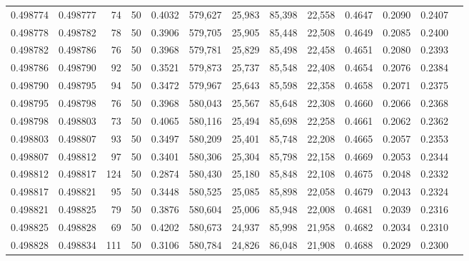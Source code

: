 \begin{tabular}{rrrrrrrrrrrrr}
0.498774 & 0.498777 &    74 &  50 &                                     0.4032 & 579,627 &  25,983 &  85,398 &  22,558 & 0.4647 & 0.2090 & 0.2407 \\
0.498778 & 0.498782 &    78 &  50 &                                     0.3906 & 579,705 &  25,905 &  85,448 &  22,508 & 0.4649 & 0.2085 & 0.2400 \\
0.498782 & 0.498786 &    76 &  50 &                                     0.3968 & 579,781 &  25,829 &  85,498 &  22,458 & 0.4651 & 0.2080 & 0.2393 \\
0.498786 & 0.498790 &    92 &  50 &                                     0.3521 & 579,873 &  25,737 &  85,548 &  22,408 & 0.4654 & 0.2076 & 0.2384 \\
0.498790 & 0.498795 &    94 &  50 &                                     0.3472 & 579,967 &  25,643 &  85,598 &  22,358 & 0.4658 & 0.2071 & 0.2375 \\
0.498795 & 0.498798 &    76 &  50 &                                     0.3968 & 580,043 &  25,567 &  85,648 &  22,308 & 0.4660 & 0.2066 & 0.2368 \\
0.498798 & 0.498803 &    73 &  50 &                                     0.4065 & 580,116 &  25,494 &  85,698 &  22,258 & 0.4661 & 0.2062 & 0.2362 \\
0.498803 & 0.498807 &    93 &  50 &                                     0.3497 & 580,209 &  25,401 &  85,748 &  22,208 & 0.4665 & 0.2057 & 0.2353 \\
0.498807 & 0.498812 &    97 &  50 &                                     0.3401 & 580,306 &  25,304 &  85,798 &  22,158 & 0.4669 & 0.2053 & 0.2344 \\
0.498812 & 0.498817 &   124 &  50 &                                     0.2874 & 580,430 &  25,180 &  85,848 &  22,108 & 0.4675 & 0.2048 & 0.2332 \\
0.498817 & 0.498821 &    95 &  50 &                                     0.3448 & 580,525 &  25,085 &  85,898 &  22,058 & 0.4679 & 0.2043 & 0.2324 \\
0.498821 & 0.498825 &    79 &  50 &                                     0.3876 & 580,604 &  25,006 &  85,948 &  22,008 & 0.4681 & 0.2039 & 0.2316 \\
0.498825 & 0.498828 &    69 &  50 &                                     0.4202 & 580,673 &  24,937 &  85,998 &  21,958 & 0.4682 & 0.2034 & 0.2310 \\
0.498828 & 0.498834 &   111 &  50 &                                     0.3106 & 580,784 &  24,826 &  86,048 &  21,908 & 0.4688 & 0.2029 & 0.2300 \\

\end{tabular}
